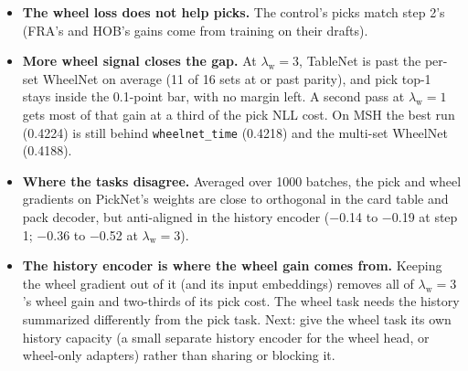 \documentclass[11pt,letterpaper]{article}
\newcommand{\code}[1]{\texttt{\small #1}}
\begin{document}
\begin{itemize}
\item \textbf{The wheel loss does not help picks.} The control's picks match step 2's (FRA's and HOB's gains come
from training on their drafts).
\item \textbf{More wheel signal closes the gap.} At $\lambda_{\text{w}}=3$, TableNet is past the per-set WheelNet on
average (11 of 16 sets at or past parity), and pick top-1 stays inside the 0.1-point bar, with no margin left.
A second pass at $\lambda_{\text{w}}=1$ gets most of that gain at a third of the pick NLL cost. On MSH the best run
(0.4224) is still behind \code{wheelnet\_time} (0.4218) and the multi-set WheelNet (0.4188).
\item \textbf{Where the tasks disagree.} Averaged over 1000 batches, the pick and wheel gradients on PickNet's
weights are close to orthogonal in the card table and pack decoder, but anti-aligned in the history encoder
($-$0.14 to $-$0.19 at step 1; $-$0.36 to $-$0.52 at $\lambda_{\text{w}}=3$).
\item \textbf{The history encoder is where the wheel gain comes from.} Keeping the wheel gradient out of it (and its
input embeddings) removes all of $\lambda_{\text{w}}=3$'s wheel gain and two-thirds of its pick cost. The wheel
task needs the history summarized differently from the pick task. Next: give the wheel task its own history
capacity (a small separate history encoder for the wheel head, or wheel-only adapters) rather than sharing or
blocking it.
\end{itemize}
\end{document}
